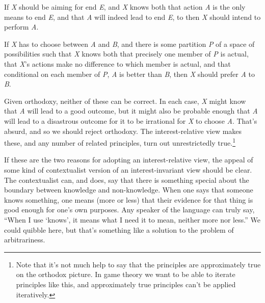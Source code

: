 \documentclass[
  10pt,
  letterpaper,
  twoside]{scrbook}
\providecommand{\tightlist}{%
  \setlength{\itemsep}{0pt}\setlength{\parskip}{0pt}}\usepackage{longtable,booktabs,array}
\begin{document}
\begin{description}
\tightlist
\item[Means-End Rationality]
If \emph{X} should be aiming for end \emph{E}, and \emph{X} knows both
that action \emph{A} is the only means to end \emph{E}, and that
\emph{A} will indeed lead to end \emph{E}, to then \emph{X} should
intend to perform \emph{A}.
\item[Strict Dominance Reasoning]
If \emph{X} has to choose between \emph{A} and \emph{B}, and there is
some partition \emph{P} of a space of possibilities such that \emph{X}
knows both that precisely one member of \emph{P} is actual, that
\emph{X}'s actions make no difference to which member is actual, and
that conditional on each member of \emph{P}, \emph{A} is better than
\emph{B}, then \emph{X} should prefer \emph{A} to \emph{B}.
\end{description}

Given orthodoxy, neither of these can be correct. In each case, \emph{X}
might know that \emph{A} will lead to a good outcome, but it might also
be probable enough that \emph{A} will lead to a disastrous outcome for
it to be irrational for \emph{X} to choose \emph{A}. That's absurd, and
so we should reject orthodoxy. The interest-relative view makes these,
and any number of related principles, turn out unrestrictedly
true.\footnote{Note that it's not much help to say that the principles
  are approximately true on the orthodox picture. In game theory we want
  to be able to iterate principles like this, and approximately true
  principles can't be applied iteratively.}

If these are the two reasons for adopting an interest-relative view, the
appeal of some kind of contextualist version of an interest-invariant
view should be clear. The contextualist can, and does, say that there is
something special about the boundary between knowledge and
non-knowledge. When one says that someone knows something, one means
(more or less) that their evidence for that thing is good enough for
one's own purposes. Any speaker of the language can truly say, ``When I
use `knows', it means what I need it to mean, neither more nor less.''
We could quibble here, but that's something like a solution to the
problem of arbitrariness.
\end{document}
